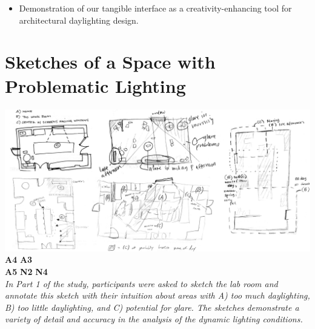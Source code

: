 \documentclass[landscape,20pt]{sciposter}
\begin{document}
\begin{minipage}[t]{10.5in}
\begin{itemize}
\item Demonstration of our tangible interface as a
  creativity-enhancing tool for architectural daylighting design.


\end{itemize}

\vspace{.3in}

\section*{Sketches of a Space with Problematic Lighting}
\includegraphics[width=1.00\columnwidth]{../gi2012_userstudy/images/sketches/all_together}%
%
\vspace{-4.8in}
{\bf A4} \hspace{.25\columnwidth}
{\bf A3}
\vspace{4in}
\\
{\bf A5} \hspace{.21\columnwidth}
{\bf N2} \hspace{.45\columnwidth}
{\bf N4}
\vspace{.5in}\\
%
{\em
In Part 1 of the study, participants were asked to sketch the
  lab room and annotate this sketch with their intuition about areas
  with A) too much daylighting, B) too little daylighting, and C)
  potential for glare.  The sketches demonstrate a variety of detail
  and accuracy in the analysis of the dynamic lighting conditions.}

\end{minipage}
\end{document}
